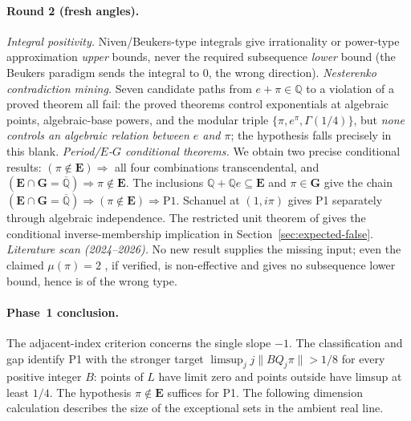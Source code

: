 \documentclass[11pt]{amsart}
\theoremstyle{definition}
\theoremstyle{remark}
\numberwithin{equation}{section}
\newcommand{\Q}{\mathbb{Q}}
\begin{document}
\paragraph{Round 2 (fresh angles).}
\emph{Integral positivity.} Niven/Beukers-type integrals give irrationality or power-type approximation \emph{upper} bounds, never the required subsequence \emph{lower} bound (the Beukers paradigm sends the integral to $0$, the wrong direction). \emph{Nesterenko contradiction mining.} Seven candidate paths from $e+\pi\in\Q$ to a violation of a proved theorem all fail: the proved theorems control exponentials at algebraic points, algebraic-base powers, and the modular triple $\{\pi,e^\pi,\Gamma(1/4)\}$, but \emph{none controls an algebraic relation between $e$ and $\pi$}; the hypothesis falls precisely in this blank. \emph{Period/$E$-$G$ conditional theorems.} We obtain two precise conditional results: $(\pi\notin\mathbf{E})\Rightarrow$ all four combinations transcendental, and $(\mathbf{E}\cap\mathbf{G}=\overline{\Q})\Rightarrow\pi\notin\mathbf{E}$. The inclusions $\Q+\Q e\subseteq\mathbf E$ and $\pi\in\mathbf G$ give the chain $(\mathbf E\cap\mathbf G=\overline{\Q})\Rightarrow(\pi\notin\mathbf E)\Rightarrow\mathrm{P1}$. Schanuel at $(1,i\pi)$ gives P1 separately through algebraic independence. The restricted unit theorem of \cite{FischlerRivoal2026} gives the conditional inverse-membership implication in Section~\ref{sec:expected-false}. \emph{Literature scan (2024--2026).} No new result supplies the missing input; even the claimed $\mu(\pi)=2$ \cite{OpenAI2026}, if verified, is non-effective and gives no subsequence lower bound, hence is of the wrong type.

\paragraph{Phase~1 conclusion.} The adjacent-index criterion concerns the
single slope $-1$. The classification and gap identify P1 with the
stronger target $\limsup_j j\|BQ_j\pi\|>1/8$ for every positive integer
$B$: points of $L$ have limit zero and points outside have limsup at
least $1/4$. The hypothesis $\pi\notin\mathbf E$ suffices for P1.
The following dimension calculation describes the size of the
exceptional sets in the ambient real line.
\end{document}
